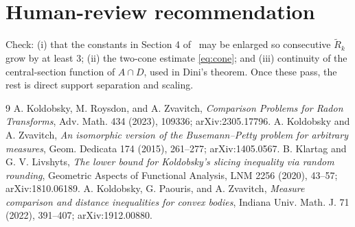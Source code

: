 \documentclass[11pt]{article}
\begin{document}
\section{Human-review recommendation}
Check: (i) that the constants in Section 4 of~\cite{KL} may be enlarged so
consecutive $\widetilde R_k$ grow by at least $3$; (ii) the two-cone estimate
\eqref{eq:cone}; and (iii) continuity of the central-section function of
$A\cap D$, used in Dini's theorem. Once these pass, the rest is direct support
separation and scaling.

\begin{thebibliography}{9}
 A. Koldobsky, M. Roysdon, and A. Zvavitch,
\emph{Comparison Problems for Radon Transforms}, Adv. Math. 434 (2023),
109336; arXiv:2305.17796.
 A. Koldobsky and A. Zvavitch,
\emph{An isomorphic version of the Busemann--Petty problem for arbitrary
measures}, Geom. Dedicata 174 (2015), 261--277; arXiv:1405.0567.
 B. Klartag and G. V. Livshyts,
\emph{The lower bound for Koldobsky's slicing inequality via random rounding},
Geometric Aspects of Functional Analysis, LNM 2256 (2020), 43--57;
arXiv:1810.06189.
 A. Koldobsky, G. Paouris, and A. Zvavitch,
\emph{Measure comparison and distance inequalities for convex bodies},
Indiana Univ. Math. J. 71 (2022), 391--407; arXiv:1912.00880.
\end{thebibliography}
\end{document}
